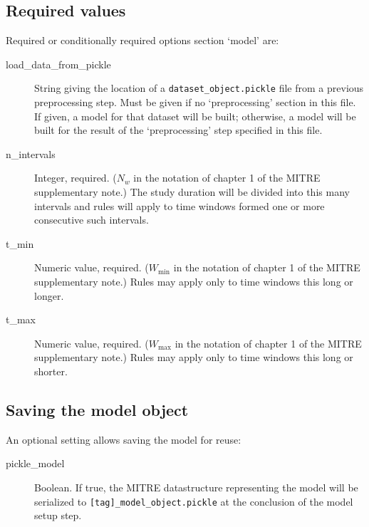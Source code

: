 \documentclass[12pt]{report}
\begin{document}
\subsection{Required values}
Required or conditionally required options section `model' are:
\begin{description}
\item[load\_data\_from\_pickle] String giving the location of a
  \texttt{dataset\_object.pickle} file from a previous preprocessing
  step. Must be given if no `preprocessing' section in this file. If
  given, a model for that dataset will be built; otherwise, a model
  will be built for the result of the `preprocessing' step specified
  in this file.
\item[n\_intervals] Integer, required. ($N_w$ in the notation of
  chapter 1 of the MITRE supplementary note.) The study duration will
  be divided into this many intervals and rules will apply to time
  windows formed one or more consecutive such intervals.
\item[t\_min] Numeric value, required. ($W_\text{min}$ in the notation of
  chapter 1 of the MITRE supplementary note.) Rules may apply only
  to time windows this long or longer.
\item[t\_max] Numeric value, required. ($W_\text{max}$ in the notation of
  chapter 1 of the MITRE supplementary note.) Rules may apply only
  to time windows this long or shorter.
\end{description}

\subsection{Saving the model object}
An optional setting allows saving the model for reuse:
\begin{description}
\item[pickle\_model] Boolean. If true, the MITRE datastructure
  representing the model will be serialized to
  \texttt{[tag]\_model\_object.pickle} at the conclusion of the model
  setup step.
\end{description}
\end{document}
